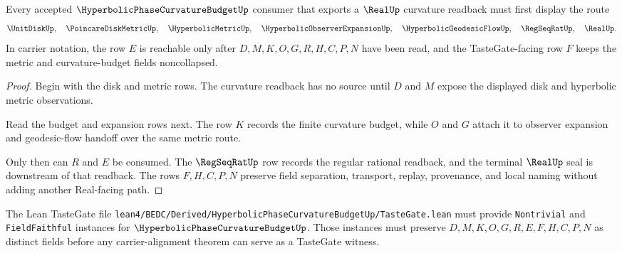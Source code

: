 \begin{theorem}
\label{thm:hyperbolic-phase-curvature-budget-real-readback-order}
Every accepted $\HyperbolicPhaseCurvatureBudgetUp$ consumer that exports a $\RealUp$ curvature readback must first display the route
$$
\UnitDiskUp,\quad \PoincareDiskMetricUp,\quad \HyperbolicMetricUp,\quad \HyperbolicObserverExpansionUp,\quad \HyperbolicGeodesicFlowUp,\quad \RegSeqRatUp,\quad \RealUp .
$$
In carrier notation, the row $E$ is reachable only after $D,M,K,O,G,R,H,C,P,N$ have been read, and the TasteGate-facing row $F$ keeps the metric and curvature-budget fields noncollapsed.
\end{theorem}
\begin{proof}
Begin with the disk and metric rows. The curvature readback has no source until $D$ and $M$ expose the displayed disk and hyperbolic metric observations.

Read the budget and expansion rows next. The row $K$ records the finite curvature budget, while $O$ and $G$ attach it to observer expansion and geodesic-flow handoff over the same metric route.

Only then can $R$ and $E$ be consumed. The $\RegSeqRatUp$ row records the regular rational readback, and the terminal $\RealUp$ seal is downstream of that readback. The rows $F,H,C,P,N$ preserve field separation, transport, replay, provenance, and local naming without adding another Real-facing path.
\end{proof}



The Lean TasteGate file \texttt{lean4/BEDC/Derived/HyperbolicPhaseCurvatureBudgetUp/TasteGate.lean} must provide \texttt{Nontrivial} and \texttt{FieldFaithful} instances for $\HyperbolicPhaseCurvatureBudgetUp$. Those instances must preserve $D,M,K,O,G,R,E,F,H,C,P,N$ as distinct fields before any carrier-alignment theorem can serve as a TasteGate witness.

